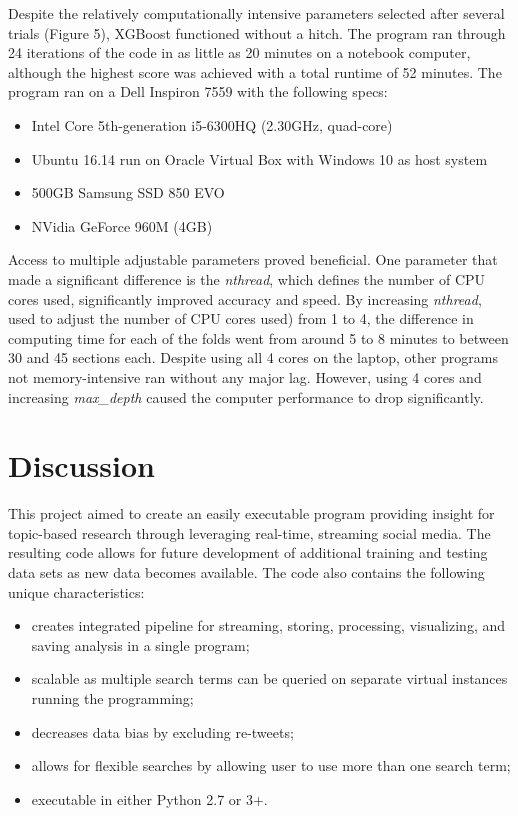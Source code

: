 Despite the relatively computationally intensive parameters selected after several 
trials (Figure 5), XGBoost functioned without a hitch.  The program ran through 24 
iterations of the code in as little as 20 minutes on a notebook computer, although 
the highest score was achieved with a total runtime of 52 minutes.  The program ran 
on a Dell Inspiron 7559 with the following specs:

\begin{itemize}
\item Intel Core 5th-generation i5-6300HQ (2.30GHz, quad-core)
\item Ubuntu 16.14 run on Oracle Virtual Box with Windows 10 as host system
\item 500GB Samsung SSD 850 EVO
\item NVidia GeForce 960M (4GB)
\end{itemize}

Access to multiple adjustable parameters proved beneficial.  One parameter that made 
a significant difference is the \emph{nthread}, which defines the number of CPU cores 
used, significantly improved accuracy and speed.  By increasing \emph{nthread}, used
to adjust the number of CPU cores used) from 1 to 4, the difference in computing time 
for each of the folds went from around 5 to 8 minutes to between 30 and 45 sections each.  
Despite using all 4 cores on the laptop, other programs not memory-intensive ran without any major lag.  
However, using 4 cores and increasing \emph{max\_depth} caused the computer performance
to drop significantly.

\section{Discussion}

This project aimed to create an easily executable program providing insight for
topic-based research through leveraging real-time, streaming social media.  The 
resulting code allows for future development of additional training and testing data 
sets as new data becomes available.  The code also contains the following
unique characteristics:

\begin{itemize}
\item creates integrated pipeline for streaming,
storing, processing, visualizing, and saving
analysis in a single program; 
\item scalable as multiple search terms can be queried on separate virtual 
instances running the programming; 
\item decreases data bias by excluding re-tweets;
\item allows for flexible searches by allowing
user to use more than one search term;
\item executable in either Python 2.7 or 3+.
\end{itemize}

